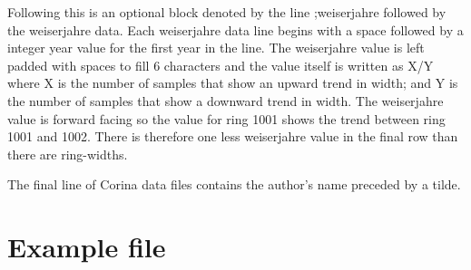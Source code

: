Following this is an optional block denoted by the line ;weiserjahre followed by the weiserjahre data. Each weiserjahre data line begins with a space followed by a integer year value for the first year in the line. The weiserjahre value is left padded with spaces to fill 6 characters and the value itself is written as X/Y where X is the number of samples that show an upward trend in width; and Y is the number of samples that show a downward trend in width. The weiserjahre value is forward facing so the value for ring 1001 shows the trend between ring 1001 and 1002. There is therefore one less weiserjahre value in the final row than there are ring-widths.

The final line of Corina data files contains the author's name preceded by a tilde. 

\newpage
\section{Example file}

